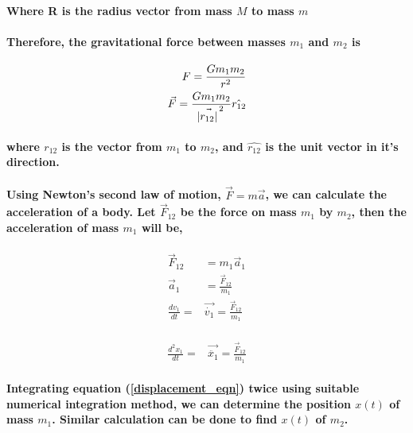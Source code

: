 \paragraph{
    Where R is the radius vector from mass $M$ to mass $m$
}
\paragraph{
    Therefore, the gravitational force between masses $m_1$ and $m_2$ is
}

\begin{equation}\label{force_eqn}
\begin{split}
    F = \frac{G m_1 m_2}{r^2}\\
    \vec{F} = \frac{G m_1 m_2}{\vec{\abs{r_{12}}}^{\, 2}} \hat{r_{12}}
\end{split}
\end{equation}

\paragraph{
    where $r_{12}$ is the vector from $m_1$ to $m_2$, and $\hat{r_{12}}$ is the unit vector in it's direction.
}

\paragraph{
    Using Newton's second law of motion, $\vec F=m \vec a$, we can calculate the acceleration of a body. Let $\vec F_{12}$ be the force on mass $m_1$ by $m_2$, then the acceleration of mass $m_1$ will be,
}

\begin{equation}
\begin{split}
    \vec F_{12} &= m_{1}\vec a_1\\
    \vec a_1 &= \frac{\vec F_{12}}{m_1}\\
    \frac{dv_1}{dt} ={} &{} \vec{\dot{v_1}} = \frac{\vec F_{12}}{m_1}\\
\end{split}
\end{equation}

\begin{equation}
\begin{split}
\frac{d^2x_1}{dt} ={} &{} \vec{\ddot {x_1}} = \frac{\vec F_{12}}{m_1} \label{displacement_eqn}
\end{split}
\end{equation}

\paragraph{
    Integrating equation (\ref{displacement_eqn}) twice using suitable numerical integration method, we can determine the position $x(t)$ of mass $m_1$. Similar calculation can be done to find $x(t)$ of $m_2$.
}

